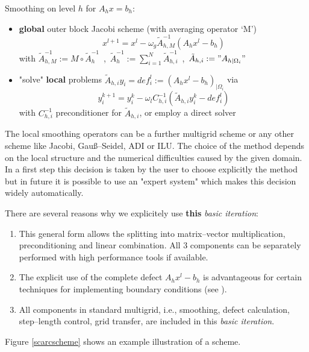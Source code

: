 { {Smoothing on level $h$ for $A_h x=b_h$:}}


\begin{itemize}
\item {\bf global} outer block Jacobi scheme (with averaging operator `M')
\[ x^{l+1} = x^l - \omega_g \tilde{A}^{-1}_{h,M} (A_h x^l - b_h) \]
with $\tilde{A}^{-1}_{h,M} := M \circ \tilde{A}^{-1}_{h}$ \,,\,
$\displaystyle \tilde{A}^{-1}_{h} := \sum_{i=1}^N \tilde{A}^{-1}_{h,i}$ \,,\,
$\tilde{A}_{h,i} := "A_{h|\Omega_i}"$

\item "solve" {\bf local} problems $\tilde{A}_{h,i} y_i = def_i^l := (A_h x^l - b_h)_{|\Omega_i}$ via
\[ y_i^{k+1} = y_i^k - \omega_l C^{-1}_{h,i} (\tilde{A}_{h,i} y_i^k - def_i^l) \]
with $C^{-1}_{h,i}$ preconditioner for $\tilde{A}_{h,i}$, or employ a direct solver
\end{itemize}

The local smoothing operators can be a further multigrid scheme
or any other scheme like Jacobi, Gau{\ss}--Seidel, ADI or ILU. The choice of the method depends on the local 
structure and the numerical difficulties caused by the given domain. In a first step this decision is taken by
the user to choose explicitly the method but in future it is possible to use
an "expert system" which makes this decision widely automatically. 

\vspace*{0.2cm}

There are several reasons why we explicitely use {\bf this} {\em basic iteration}:

\begin{enumerate}
\item This general form allows the splitting into matrix--vector 
multiplication, preconditioning and linear combination. All 3 components can be 
separately performed with high performance tools if available.
\item The explicit use of the complete defect $A_h x^l - b_h$ is  advantageous for certain 
techniques for implementing boundary conditions (see \cite{Turek1999h}).
\item All components in standard multigrid, i.e., smoothing, defect calculation, step--length control, 
grid transfer, are included in this {\em basic iteration}.
\end{enumerate}

Figure \ref{scarcscheme} shows an example illustration of a \scarc scheme.

\vspace*{0.5cm}

